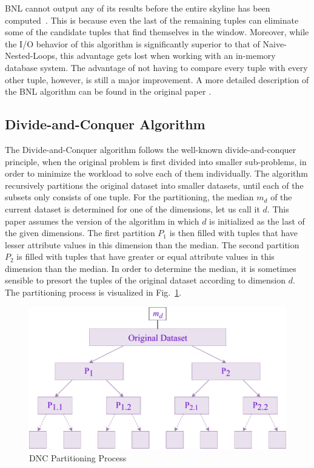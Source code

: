 BNL cannot output any of its results before the entire skyline has been computed~\cite{survey}. This is because even the last of the remaining tuples can eliminate some of the candidate tuples that find themselves in the window. 
Moreover, while the I/O behavior of this algorithm is significantly superior to that of Naive-Nested-Loops, this advantage gets lost when working with an in-memory database system. The advantage of not having to compare every tuple with every other tuple, however, is still a major improvement. 
A more detailed description of the BNL algorithm can be found in the original paper \cite{kossmann}. 

\subsection{Divide-and-Conquer Algorithm} \label{subsection:dnc}
The Divide-and-Conquer algorithm \cite{kossmann, kung} follows the well-known divide-and-conquer principle, when the original problem is first divided into smaller sub-problems, in order to minimize the workload to solve each of them individually. The algorithm recursively partitions the original dataset into smaller datasets, until each of the subsets only consists of one tuple. For the partitioning, the median $m_{d}$ of the current dataset is determined for one of the dimensions, let us call it $d$. This paper assumes the version of the algorithm in which $d$ is initialized as the last of the given dimensions. The first partition $P_{1}$ is then filled with tuples that have lesser attribute values in this dimension than the median. The second partition $P_{2}$ is filled with tuples that have greater or equal attribute values in this dimension than the median. In order to determine the median, it is sometimes sensible to presort the tuples of the original dataset according to dimension $d$. The partitioning process is visualized in Fig.~\ref{fig:dnc-partitioning}. 

\begin{figure}[h]
\centering
\includegraphics[width=0.7\linewidth]{figures/dnc-partitioning}
\caption{DNC Partitioning Process}
\label{fig:dnc-partitioning}
\end{figure}

